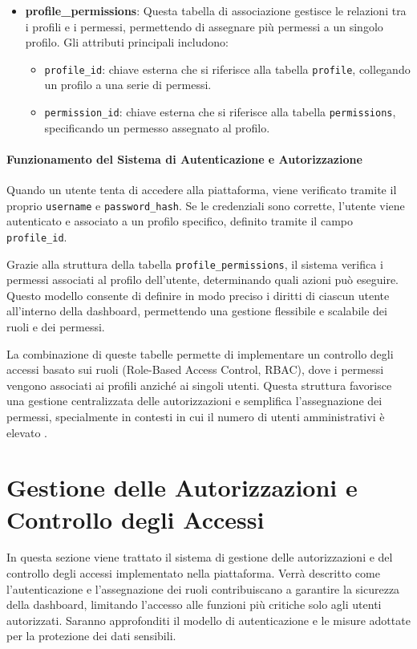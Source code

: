 \begin{itemize}
    \item \textbf{profile\_permissions}: Questa tabella di associazione gestisce le relazioni tra i profili e i permessi, permettendo di assegnare più permessi a un singolo profilo. Gli attributi principali includono:
        \begin{itemize}
            \item \texttt{profile\_id}: chiave esterna che si riferisce alla tabella \texttt{profile}, collegando un profilo a una serie di permessi.
            \item \texttt{permission\_id}: chiave esterna che si riferisce alla tabella \texttt{permissions}, specificando un permesso assegnato al profilo.
        \end{itemize}
\end{itemize}

\paragraph{Funzionamento del Sistema di Autenticazione e Autorizzazione}
Quando un utente tenta di accedere alla piattaforma, viene verificato tramite il proprio \texttt{username} e \texttt{password\_hash}. Se le credenziali sono corrette, l’utente viene autenticato e associato a un profilo specifico, definito tramite il campo \texttt{profile\_id}. 

Grazie alla struttura della tabella \texttt{profile\_permissions}, il sistema verifica i permessi associati al profilo dell’utente, determinando quali azioni può eseguire. Questo modello consente di definire in modo preciso i diritti di ciascun utente all'interno della dashboard, permettendo una gestione flessibile e scalabile dei ruoli e dei permessi.

La combinazione di queste tabelle permette di implementare un controllo degli accessi basato sui ruoli (Role-Based Access Control, RBAC), dove i permessi vengono associati ai profili anziché ai singoli utenti. Questa struttura favorisce una gestione centralizzata delle autorizzazioni e semplifica l’assegnazione dei permessi, specialmente in contesti in cui il numero di utenti amministrativi è elevato \cite{sandhu1996role}.


\section{Gestione delle Autorizzazioni e Controllo degli Accessi}

In questa sezione viene trattato il sistema di gestione delle autorizzazioni e del controllo degli accessi implementato nella piattaforma. Verrà descritto come l’autenticazione e l’assegnazione dei ruoli contribuiscano a garantire la sicurezza della dashboard, limitando l’accesso alle funzioni più critiche solo agli utenti autorizzati. Saranno approfonditi il modello di autenticazione e le misure adottate per la protezione dei dati sensibili.

